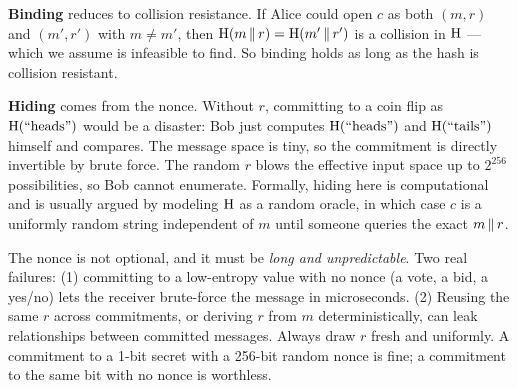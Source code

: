 \begin{whybox}
\textbf{Binding} reduces to collision resistance. If Alice could open $c$ as both $(m,r)$ and $(m',r')$ with $m \ne m'$, then $\operatorname{H}(m\,\|\, r) = \operatorname{H}(m'\,\|\, r')$ is a collision in $\operatorname{H}$ --- which we assume is infeasible to find. So binding holds as long as the hash is collision resistant.

\textbf{Hiding} comes from the nonce. Without $r$, committing to a coin flip as $\operatorname{H}(\text{``heads''})$ would be a disaster: Bob just computes $\operatorname{H}(\text{``heads''})$ and $\operatorname{H}(\text{``tails''})$ himself and compares. The message space is tiny, so the commitment is directly invertible by brute force. The random $r$ blows the effective input space up to $2^{256}$ possibilities, so Bob cannot enumerate. Formally, hiding here is computational and is usually argued by modeling $\operatorname{H}$ as a random oracle, in which case $c$ is a uniformly random string independent of $m$ until someone queries the exact $m\,\|\, r$.
\end{whybox}

\begin{trapbox}
The nonce is not optional, and it must be \emph{long and unpredictable}. Two real failures: (1) committing to a low-entropy value with no nonce (a vote, a bid, a yes/no) lets the receiver brute-force the message in microseconds. (2) Reusing the same $r$ across commitments, or deriving $r$ from $m$ deterministically, can leak relationships between committed messages. Always draw $r$ fresh and uniformly. A commitment to a 1-bit secret with a 256-bit random nonce is fine; a commitment to the same bit with no nonce is worthless.
\end{trapbox}


